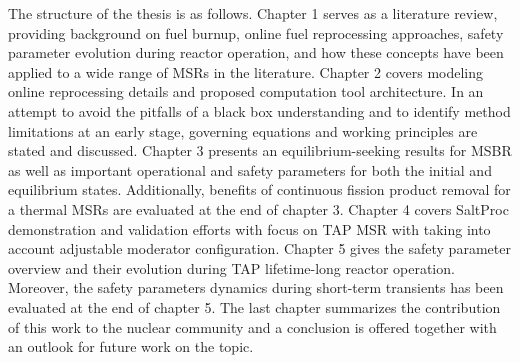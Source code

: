 The structure of the thesis is as follows. Chapter 1 serves as a literature 
review, providing background on fuel burnup, online fuel reprocessing 
approaches, safety parameter evolution during reactor operation, and how these 
concepts have been applied to a wide range of \glspl{MSR} in the literature. 
Chapter 2 covers modeling online reprocessing details and proposed computation 
tool architecture. In an attempt to avoid the pitfalls of
a black box 
understanding and to identify method limitations at an early
stage, governing 
equations and working principles are stated and discussed. Chapter 3 presents 
an equilibrium-seeking results for \gls{MSBR} as well as important operational 
and safety parameters for both the initial and equilibrium states. 
Additionally, benefits of continuous fission product removal for a thermal 
\glspl{MSR} are evaluated at the end of chapter 3. Chapter 4 covers SaltProc 
demonstration and validation efforts with focus on \gls{TAP} \gls{MSR} with 
taking into account adjustable moderator configuration. Chapter 5 gives the 
safety parameter overview and their evolution during \gls{TAP} lifetime-long 
reactor operation. Moreover, the safety parameters dynamics during short-term 
transients has been evaluated at the end of chapter 5. The last chapter
summarizes the contribution of this work to the nuclear community and a 
conclusion is offered together
with an outlook for future work on the topic.